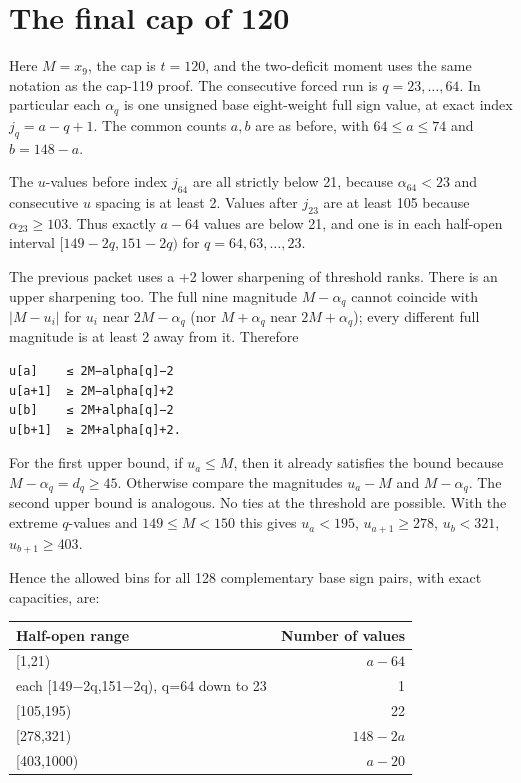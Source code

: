 \documentclass[11pt,letterpaper]{article}
\begin{document}
\section{The final cap of 120}\label{the-final-cap-of-120}

Here \(M=x_9\), the cap is \(t=120\), and the two-deficit moment uses
the same notation as the cap-119 proof. The consecutive forced run is
\(q=23,\ldots,64\). In particular each \(\alpha_q\) is one unsigned base
eight-weight full sign value, at exact index \(j_q=a-q+1\). The common
counts \(a,b\) are as before, with \(64\le a\le74\) and \(b=148-a\).

The \(u\)-values before index \(j_{64}\) are all strictly below 21,
because \(\alpha_{64}<23\) and consecutive \(u\) spacing is at least 2.
Values after \(j_{23}\) are at least 105 because \(\alpha_{23}\ge103\).
Thus exactly \(a-64\) values are below 21, and one is in each half-open
interval \([149-2q,151-2q)\) for \(q=64,63,\ldots,23\).

The previous packet uses a +2 lower sharpening of threshold ranks. There
is an upper sharpening too. The full nine magnitude \(M-\alpha_q\)
cannot coincide with \(|M-u_i|\) for \(u_i\) near \(2M-\alpha_q\) (nor
\(M+\alpha_q\) near \(2M+\alpha_q\)); every different full magnitude is
at least 2 away from it. Therefore

\begin{verbatim}
u[a]    ≤ 2M−alpha[q]−2
u[a+1]  ≥ 2M−alpha[q]+2
u[b]    ≤ 2M+alpha[q]−2
u[b+1]  ≥ 2M+alpha[q]+2.
\end{verbatim}

For the first upper bound, if \(u_a\le M\), then it already satisfies
the bound because \(M-\alpha_q=d_q\ge45\). Otherwise compare the
magnitudes \(u_a-M\) and \(M-\alpha_q\). The second upper bound is
analogous. No ties at the threshold are possible. With the extreme
\(q\)-values and \(149\le M<150\) this gives \(u_a<195\),
\(u_{a+1}\ge278\), \(u_b<321\), \(u_{b+1}\ge403\).

Hence the allowed bins for all 128 complementary base sign pairs, with
exact capacities, are:

\begin{longtable}[]{@{}lr@{}}
\toprule\noalign{}
Half-open range & Number of values \\
\midrule\noalign{}
\endhead
\bottomrule\noalign{}
\endlastfoot
{[}1,21) & \(a-64\) \\
each {[}149−2q,151−2q), q=64 down to 23 & 1 \\
{[}105,195) & 22 \\
{[}278,321) & \(148-2a\) \\
{[}403,1000) & \(a-20\) \\
\end{longtable}
\end{document}

